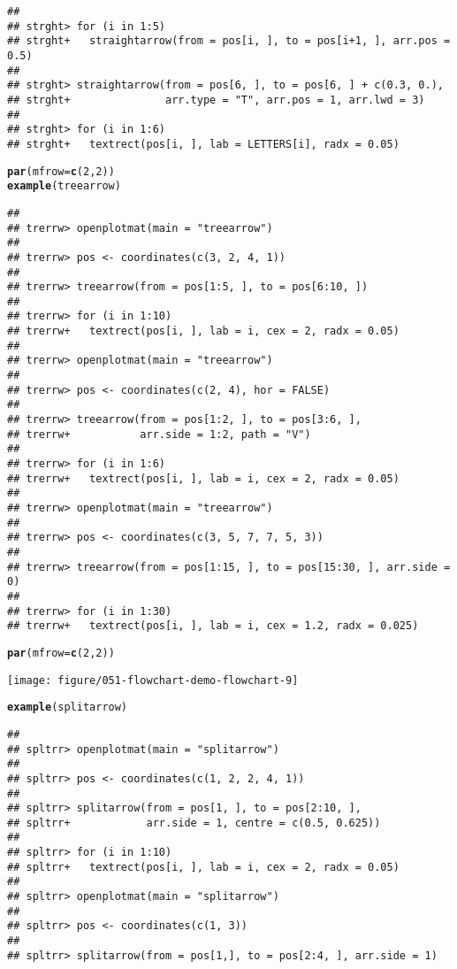 \documentclass{article}\usepackage[]{graphicx}\usepackage[]{xcolor}
\makeatletter
\def\maxwidth{ %
  \ifdim\Gin@nat@width>\linewidth
    \linewidth
  \else
    \Gin@nat@width
  \fi
}
\newcommand{\hlnum}[1]{\textcolor[rgb]{0.686,0.059,0.569}{#1}}%
\newcommand{\hldef}[1]{\textcolor[rgb]{0.345,0.345,0.345}{#1}}%
\newcommand{\hlkwc}[1]{\textcolor[rgb]{0.333,0.667,0.333}{#1}}%
\newcommand{\hlkwd}[1]{\textcolor[rgb]{0.737,0.353,0.396}{\textbf{#1}}}%
\newenvironment{kframe}{%
 \def\at@end@of@kframe{}%
 \ifinner\ifhmode%
  \def\at@end@of@kframe{\end{minipage}}%
  \begin{minipage}{\columnwidth}%
 \fi\fi%
 \def\FrameCommand##1{\hskip\@totalleftmargin \hskip-\fboxsep
 \colorbox{shadecolor}{##1}\hskip-\fboxsep
     \hskip-\linewidth \hskip-\@totalleftmargin \hskip\columnwidth}%
 \MakeFramed {\advance\hsize-\width
   \@totalleftmargin\z@ \linewidth\hsize
   \@setminipage}}%
 {\par\unskip\endMakeFramed%
 \at@end@of@kframe}
\newenvironment{knitrout}{}{} %
\makeatother
\begin{document}
\begin{knitrout}
\begin{kframe}
\begin{verbatim}
## 
## strght> for (i in 1:5) 
## strght+   straightarrow(from = pos[i, ], to = pos[i+1, ], arr.pos = 0.5)
## 
## strght> straightarrow(from = pos[6, ], to = pos[6, ] + c(0.3, 0.), 
## strght+               arr.type = "T", arr.pos = 1, arr.lwd = 3)    
## 
## strght> for (i in 1:6) 
## strght+   textrect(pos[i, ], lab = LETTERS[i], radx = 0.05)
\end{verbatim}
\begin{alltt}
\hlkwd{par}\hldef{(}\hlkwc{mfrow} \hldef{=} \hlkwd{c}\hldef{(}\hlnum{2}\hldef{,} \hlnum{2}\hldef{))}
\hlkwd{example}\hldef{(treearrow)}
\end{alltt}
\begin{verbatim}
## 
## trerrw> openplotmat(main = "treearrow")
## 
## trerrw> pos <- coordinates(c(3, 2, 4, 1))
## 
## trerrw> treearrow(from = pos[1:5, ], to = pos[6:10, ])
## 
## trerrw> for (i in 1:10) 
## trerrw+   textrect(pos[i, ], lab = i, cex = 2, radx = 0.05)
## 
## trerrw> openplotmat(main = "treearrow")
## 
## trerrw> pos <- coordinates(c(2, 4), hor = FALSE)
## 
## trerrw> treearrow(from = pos[1:2, ], to = pos[3:6, ], 
## trerrw+           arr.side = 1:2, path = "V")
## 
## trerrw> for (i in 1:6) 
## trerrw+   textrect(pos[i, ], lab = i, cex = 2, radx = 0.05)
## 
## trerrw> openplotmat(main = "treearrow")
## 
## trerrw> pos <- coordinates(c(3, 5, 7, 7, 5, 3))
## 
## trerrw> treearrow(from = pos[1:15, ], to = pos[15:30, ], arr.side = 0)
## 
## trerrw> for (i in 1:30) 
## trerrw+   textrect(pos[i, ], lab = i, cex = 1.2, radx = 0.025)
\end{verbatim}
\begin{alltt}
\hlkwd{par}\hldef{(}\hlkwc{mfrow} \hldef{=} \hlkwd{c}\hldef{(}\hlnum{2}\hldef{,} \hlnum{2}\hldef{))}
\end{alltt}
\end{kframe}
\texttt{[image: figure/051-flowchart-demo-flowchart-9]} 
\begin{kframe}\begin{alltt}
\hlkwd{example}\hldef{(splitarrow)}
\end{alltt}
\begin{verbatim}
## 
## spltrr> openplotmat(main = "splitarrow")
## 
## spltrr> pos <- coordinates(c(1, 2, 2, 4, 1))
## 
## spltrr> splitarrow(from = pos[1, ], to = pos[2:10, ], 
## spltrr+            arr.side = 1, centre = c(0.5, 0.625))
## 
## spltrr> for (i in 1:10) 
## spltrr+   textrect(pos[i, ], lab = i, cex = 2, radx = 0.05)
## 
## spltrr> openplotmat(main = "splitarrow")
## 
## spltrr> pos <- coordinates(c(1, 3))
## 
## spltrr> splitarrow(from = pos[1,], to = pos[2:4, ], arr.side = 1)

\end{verbatim}
\end{kframe}
\end{knitrout}
\end{document}
